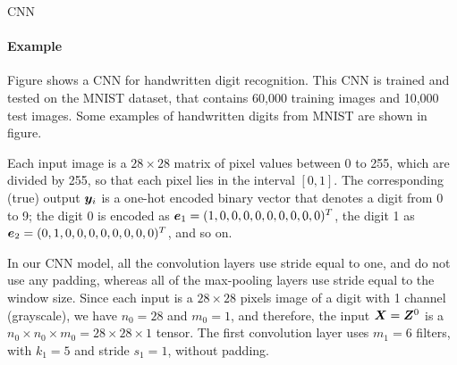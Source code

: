 %
\begin{frame}{CNN}
\framesubtitle{Example}
Figure shows a CNN for handwritten digit
    recognition. This CNN is trained and tested on the MNIST dataset,
    that contains 60,000 training images and 10,000 test images. 
    Some examples of handwritten digits from MNIST are shown in
figure.


\medskip

    Each input image is a $ 28
    \times 28$ matrix of pixel values between 0 to 255, which are
    divided by 255, so that each pixel lies in the interval $[0,1]$.
    The corresponding (true)
    output ${\boldsymbol y}_i$ is a one-hot encoded binary vector that denotes a
    digit from 0 to 9;  the digit 0 is encoded as
    ${\boldsymbol e}_1 = (1,0,0,0,0,0,0,0,0,0)^T$, the digit 1 as ${\boldsymbol e}_2 =
    (0,1,0,0,0,0,0,0,0,0)^T$,
    and so on. 
    


\medskip

    In our CNN model, all the convolution layers use stride equal to one,
    and do not use any padding, whereas all of the max-pooling layers
    use stride equal to the window size.
    Since each input is a
    $28 \times 28$ pixels image of a digit with 1 channel (grayscale),
    we have $n_0=28$ and $m_0=1$, and therefore, the
    input ${\boldsymbol X} = {\boldsymbol Z}^0$ is a $n_0 \times n_0 \times m_0 = 28 \times 28
    \times 1$ tensor. 
    The first convolution
    layer uses $m_1=6$ filters, with $k_1=5$ and stride $s_1=1$, without padding. 
\end{frame}

